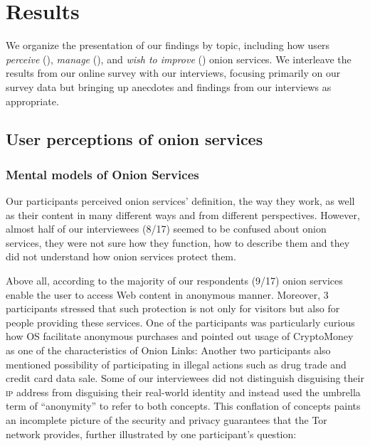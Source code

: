 \section{Results}
\label{sec:results}
We organize the presentation of our findings by topic, including how users
\emph{perceive} (), \emph{manage} (),
and \emph{wish to improve} () onion services.  We interleave the
results from our online survey with our interviews, focusing primarily on our
survey data but bringing up anecdotes and findings from our interviews as
appropriate.

\subsection{User perceptions of onion services}
\label{sec:perception}

\subsubsection{Mental models of Onion Services}
Our participants perceived onion services’ definition, the way they work, as well as their content in many different ways and from different perspectives. However, almost half of our interviewees (8/17) seemed to be confused about onion services, they were not sure how they function, how to describe them and they did not understand how onion services protect them. 

Above all, according to the majority of our respondents (9/17) onion services enable the user to access Web content in anonymous manner. Moreover, 3 participants stressed that such protection is not only for visitors but also for people providing these services. One of the participants was particularly curious how OS facilitate anonymous purchases and pointed out usage of CryptoMoney as one of the characteristics of Onion Links:  Another two participants also mentioned possibility of participating in illegal actions such as drug trade and credit card data sale. Some of our interviewees did not distinguish disguising their \textsc{ip}  address from disguising their real-world identity and instead used the umbrella term of “anonymity” to refer
to both concepts. This conflation of concepts paints
an incomplete picture of the security and privacy guarantees
that the Tor network provides, further illustrated
by one participant’s question: 

